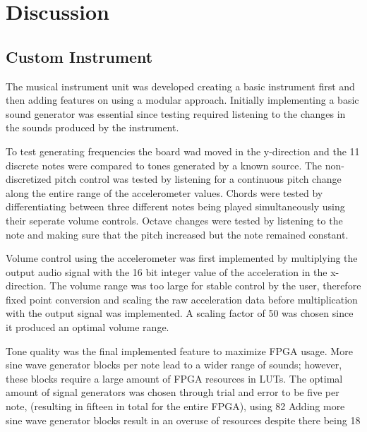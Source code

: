 \section{Discussion}
\subsection{Custom Instrument}
The musical instrument unit was developed creating a basic instrument first and then adding features on using a modular approach. 
 Initially implementing a basic sound generator was essential since testing required listening to the changes in the sounds produced by the instrument.

To test generating frequencies the board wad moved in the y-direction and the 11 discrete notes were compared to tones generated by a known source. The non-discretized pitch control was tested by listening for a continuous pitch change along the entire range of the accelerometer values. Chords were tested by differentiating between three different notes being played simultaneously using their seperate volume controls. Octave changes were tested by listening to the note and making sure that the pitch increased but the note remained constant.

Volume control using the accelerometer was first implemented by multiplying the output audio signal with the 16 bit integer value of the acceleration in the x-direction.
 The volume range was too large for stable control by the user, therefore fixed point conversion and scaling the raw acceleration data before multiplication with the output signal was implemented.
 A scaling factor of 50 was chosen since it produced an optimal volume range.

Tone quality was the final implemented feature to maximize FPGA usage.
 More sine wave generator blocks per note lead to a wider range of sounds; however, these blocks require a large amount of FPGA resources in LUTs.
 The optimal amount of signal generators was chosen through trial and error to be five per note, (resulting in fifteen in total for the entire FPGA), using 82%
 Adding more sine wave generator blocks result in an overuse of resources despite there being 18%

